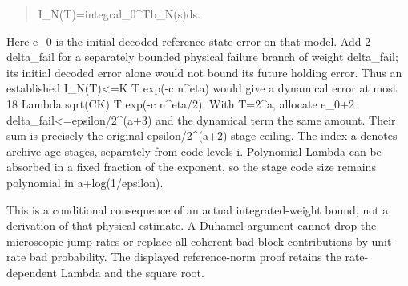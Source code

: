 \documentclass[
]{article}
\begin{document}
\begin{quote}
\noindent I\allowbreak{}\_\allowbreak{}N\allowbreak{}(\allowbreak{}T\allowbreak{})\allowbreak{}\hspace*{0.525em}\allowbreak{}=\allowbreak{}\hspace*{0.525em}\allowbreak{}i\allowbreak{}n\allowbreak{}t\allowbreak{}e\allowbreak{}g\allowbreak{}r\allowbreak{}a\allowbreak{}l\allowbreak{}\_\allowbreak{}0\allowbreak{}\^{}\allowbreak{}T\allowbreak{}\hspace*{0.525em}\allowbreak{}b\allowbreak{}\_\allowbreak{}N\allowbreak{}(\allowbreak{}s\allowbreak{})\allowbreak{}\hspace*{0.525em}\allowbreak{}d\allowbreak{}s\allowbreak{}.\par
\end{quote}

Here e\_0 is the initial decoded reference-state error on that model.
Add 2 delta\_fail for a separately bounded physical failure branch of
weight delta\_fail; its initial decoded error alone would not bound its
future holding error. Thus an established I\_N(T)\textless=K T exp(-c
n\^{}eta) would give a dynamical error at most 18 Lambda sqrt(CK) T
exp(-c n\^{}eta/2). With T=2\^{}a, allocate e\_0+2
d\allowbreak{}e\allowbreak{}l\allowbreak{}t\allowbreak{}a\allowbreak{}\_\allowbreak{}f\allowbreak{}a\allowbreak{}i\allowbreak{}l\allowbreak{}<\allowbreak{}=\allowbreak{}e\allowbreak{}p\allowbreak{}s\allowbreak{}i\allowbreak{}l\allowbreak{}o\allowbreak{}n\allowbreak{}/\allowbreak{}2\allowbreak{}\^{}\allowbreak{}(\allowbreak{}a\allowbreak{}+\allowbreak{}3\allowbreak{})
and the dynamical term the same amount. Their sum is precisely the
original
e\allowbreak{}p\allowbreak{}s\allowbreak{}i\allowbreak{}l\allowbreak{}o\allowbreak{}n\allowbreak{}/\allowbreak{}2\allowbreak{}\^{}\allowbreak{}(\allowbreak{}a\allowbreak{}+\allowbreak{}2\allowbreak{})
stage ceiling. The index a denotes archive age stages, separately from
code levels i. Polynomial Lambda can be absorbed in a fixed fraction of
the exponent, so the stage code size remains polynomial in
a\allowbreak{}+\allowbreak{}l\allowbreak{}o\allowbreak{}g\allowbreak{}(\allowbreak{}1\allowbreak{}/\allowbreak{}e\allowbreak{}p\allowbreak{}s\allowbreak{}i\allowbreak{}l\allowbreak{}o\allowbreak{}n\allowbreak{})\allowbreak{}.

This is a conditional consequence of an actual integrated-weight bound,
not a derivation of that physical estimate. A Duhamel argument cannot
drop the microscopic jump rates or replace all coherent bad-block
contributions by unit-rate bad probability. The displayed reference-norm
proof retains the rate-dependent Lambda and the square root.
\end{document}
